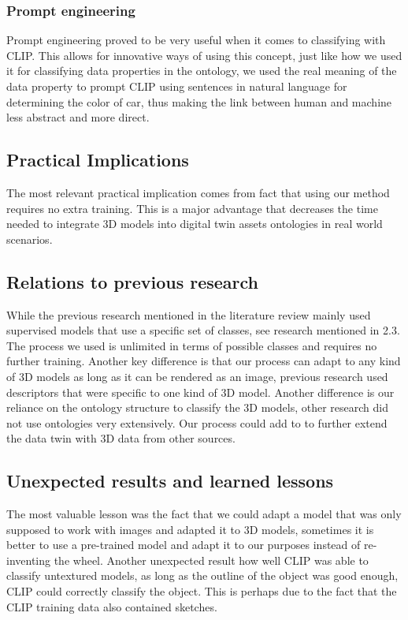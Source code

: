 \documentclass[a4paper,11pt,oneside]{article}
\begin{document}
  \subsubsection{Prompt engineering}
  Prompt engineering proved to be very useful when it comes to classifying with CLIP. This allows for innovative ways of using this concept, just like how we used it for classifying data properties in the ontology, we used the real meaning of the data property to prompt CLIP using sentences in natural language for determining the color of car, thus making the link between human and machine less abstract and more direct. 
  \subsection{Practical Implications}
  The most relevant practical implication comes from fact that using our method requires no extra training. This is a major advantage that decreases the time needed to integrate 3D models into digital twin assets ontologies in real world scenarios. 
  \subsection{Relations to previous research} 
  While the previous research mentioned in the literature review mainly used supervised models that use a specific set of classes, see research mentioned in 2.3. The process we used is unlimited in terms of possible classes and requires no further training. Another key difference is that our process can adapt to any kind of 3D models as long as it can be rendered as an image, previous research used descriptors that were specific to one kind of 3D model. Another difference is our reliance on the ontology structure to classify the 3D models, other research did not use ontologies very extensively. Our process could add to \cite{objectdetectionDT} to  further extend the data twin with 3D data from other sources.
  \subsection{Unexpected results and learned lessons}
  The most valuable lesson was the fact that we could adapt a model that was only supposed to work with images and adapted it to 3D models, sometimes it is better to use a pre-trained model and adapt it to our purposes instead of re-inventing the wheel. Another unexpected result how well CLIP was able to classify untextured models, as long as the outline of the object was good enough, CLIP could correctly classify the object. This is perhaps due to the fact that the CLIP training data also contained sketches. 
 
\end{document}
